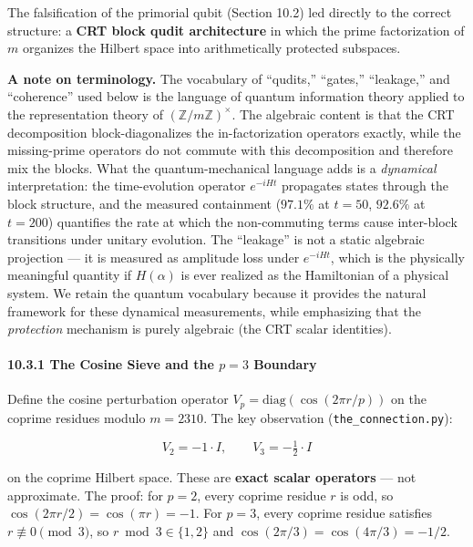 \documentclass[11pt,letterpaper]{article}
\theoremstyle{definition}
\theoremstyle{remark}
\begin{document}
The falsification of the primorial qubit (Section 10.2) led directly to the correct structure: a \textbf{CRT block qudit architecture} in which the prime factorization of $m$ organizes the Hilbert space into arithmetically protected subspaces.

\textbf{A note on terminology.} The vocabulary of ``qudits,'' ``gates,'' ``leakage,'' and ``coherence'' used below is the language of quantum information theory applied to the representation theory of $(\mathbb{Z}/m\mathbb{Z})^\times$. The algebraic content is that the CRT decomposition block-diagonalizes the in-factorization operators exactly, while the missing-prime operators do not commute with this decomposition and therefore mix the blocks. What the quantum-mechanical language adds is a \emph{dynamical} interpretation: the time-evolution operator $e^{-iHt}$ propagates states through the block structure, and the measured containment ($97.1\%$ at $t = 50$, $92.6\%$ at $t = 200$) quantifies the rate at which the non-commuting terms cause inter-block transitions under unitary evolution. The ``leakage'' is not a static algebraic projection --- it is measured as amplitude loss under $e^{-iHt}$, which is the physically meaningful quantity if $H(\alpha)$ is ever realized as the Hamiltonian of a physical system. We retain the quantum vocabulary because it provides the natural framework for these dynamical measurements, while emphasizing that the \emph{protection} mechanism is purely algebraic (the CRT scalar identities).

\paragraph{\texorpdfstring{10.3.1 The Cosine Sieve and the $p = 3$ Boundary}{10.3.1 The Cosine Sieve and the p = 3 Boundary}}\label{the-cosine-sieve-and-the-p-3-boundary}

Define the cosine perturbation operator $V_p = \text{diag}(\cos(2\pi r / p))$ on the coprime residues modulo $m = 2310$. The key observation (\texttt{the\_connection.py}):

\[V_2 = -1 \cdot I, \qquad V_3 = -\tfrac{1}{2} \cdot I\]

on the coprime Hilbert space. These are \textbf{exact scalar operators} --- not approximate. The proof: for $p = 2$, every coprime residue $r$ is odd, so $\cos(2\pi r / 2) = \cos(\pi r) = -1$. For $p = 3$, every coprime residue satisfies $r \not\equiv 0 \pmod{3}$, so $r \bmod 3 \in \{1, 2\}$ and $\cos(2\pi / 3) = \cos(4\pi / 3) = -1/2$.
\end{document}
